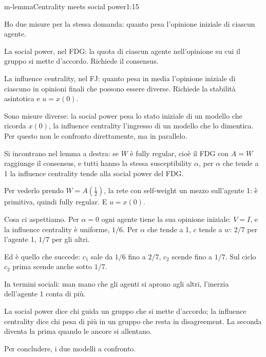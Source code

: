 \begin{slidedue}{m-lemma}{Centrality meets social power}{1:15}
  \begin{discorso}
    \item Ho due misure per la stessa domanda: quanto pesa l'opinione iniziale di ciascun agente.
    \item La social power, nel FDG: la quota di ciascun agente nell'opinione su cui il gruppo si mette d'accordo. Richiede il consensus.
    \item La influence centrality, nel FJ: quanto pesa in media l'opinione iniziale di ciascuno in opinioni finali che possono essere diverse. Richiede la stabilità asintotica e $u=x(0)$.
    \item Sono misure diverse: la social power pesa lo stato iniziale di un modello che ricorda $x(0)$, la influence centrality l'ingresso di un modello che lo dimentica. Per questo non le confronto direttamente, ma in parallelo.
    \item Si incontrano nel lemma a destra: se $W$ è fully regular, cioè il FDG con $A=W$ raggiunge il consensus, e tutti hanno la stessa susceptibility $\alpha$, per $\alpha$ che tende a 1 la influence centrality tende alla social power del FDG.
    \item Per vederlo prendo $W=A(\tfrac12)$, la rete con self-weight un mezzo sull'agente 1: è primitiva, quindi fully regular. E $u=x(0)$.
    \item Cosa ci aspettiamo. Per $\alpha=0$ ogni agente tiene la sua opinione iniziale: $V=I$, e la influence centrality è uniforme, $1/6$. Per $\alpha$ che tende a 1, $c$ tende a $w$: $2/7$ per l'agente 1, $1/7$ per gli altri.
    \item \clic Ed è quello che succede: $c_1$ sale da $1/6$ fino a $2/7$, $c_2$ scende fino a $1/7$. Sul ciclo $c_2$ prima scende anche sotto $1/7$.
    \item In termini sociali: man mano che gli agenti si aprono agli altri, l'inerzia dell'agente 1 conta di più.
    \item La social power dice chi guida un gruppo che si mette d'accordo; la influence centrality dice chi pesa di più in un gruppo che resta in disagreement. La seconda diventa la prima quando le ancore si allentano.
    \item Per concludere, i due modelli a confronto.
  \end{discorso}
\end{slidedue}


